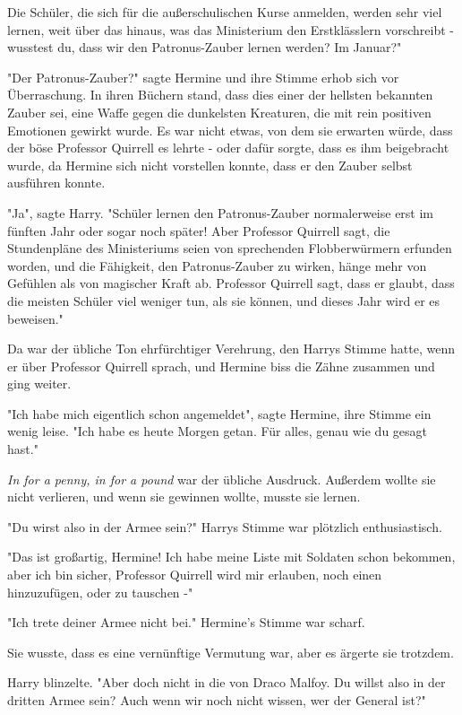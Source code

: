{Die Schüler, die sich für die außerschulischen Kurse anmelden, werden sehr viel lernen, weit über das hinaus, was das Ministerium den Erstklässlern vorschreibt - wusstest du, dass wir den Patronus-Zauber lernen werden? Im Januar?"

"Der Patronus-Zauber?" sagte Hermine und ihre Stimme erhob sich vor Überraschung. In ihren Büchern stand, dass dies einer der hellsten bekannten Zauber sei, eine Waffe gegen die dunkelsten Kreaturen, die mit rein positiven Emotionen gewirkt wurde. Es war nicht etwas, von dem sie erwarten würde, dass der böse Professor Quirrell es lehrte - oder dafür sorgte, dass es ihm beigebracht wurde, da Hermine sich nicht vorstellen konnte, dass er den Zauber selbst ausführen konnte.

"Ja", sagte Harry. "Schüler lernen den Patronus-Zauber normalerweise erst im fünften Jahr oder sogar noch später! Aber Professor Quirrell sagt, die Stundenpläne des Ministeriums seien von sprechenden Flobberwürmern erfunden worden, und die Fähigkeit, den Patronus-Zauber zu wirken, hänge mehr von Gefühlen als von magischer Kraft ab. Professor Quirrell sagt, dass er glaubt, dass die meisten Schüler viel weniger tun, als sie können, und dieses Jahr wird er es beweisen."

Da war der übliche Ton ehrfürchtiger Verehrung, den Harrys Stimme hatte, wenn er über Professor Quirrell sprach, und Hermine biss die Zähne zusammen und ging weiter.

"Ich habe mich eigentlich schon angemeldet", sagte Hermine, ihre Stimme ein wenig leise. "Ich habe es heute Morgen getan. Für alles, genau wie du gesagt hast."

\emph{In for a penny, in for a pound} war der übliche Ausdruck. Außerdem wollte sie nicht verlieren, und wenn sie gewinnen wollte, musste sie lernen.

"Du wirst also in der Armee sein?" Harrys Stimme war plötzlich enthusiastisch.

"Das ist großartig, Hermine! Ich habe meine Liste mit Soldaten schon bekommen, aber ich bin sicher, Professor Quirrell wird mir erlauben, noch einen hinzuzufügen, oder zu tauschen -"

"Ich trete deiner Armee nicht bei." Hermine's Stimme war scharf.

Sie wusste, dass es eine vernünftige Vermutung war, aber es ärgerte sie trotzdem.

Harry blinzelte. "Aber doch nicht in die von Draco Malfoy. Du willst also in der dritten Armee sein? Auch wenn wir noch nicht wissen, wer der General ist?"

}
